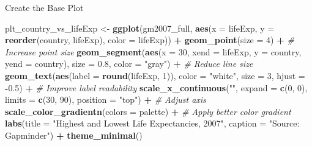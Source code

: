 \documentclass[
  ignorenonframetext,
]{beamer}
\newenvironment{Shaded}{\begin{snugshade}}{\end{snugshade}}
\newcommand{\AttributeTok}[1]{\textcolor[rgb]{0.13,0.29,0.53}{#1}}
\newcommand{\CommentTok}[1]{\textcolor[rgb]{0.56,0.35,0.01}{\textit{#1}}}
\newcommand{\DecValTok}[1]{\textcolor[rgb]{0.00,0.00,0.81}{#1}}
\newcommand{\FloatTok}[1]{\textcolor[rgb]{0.00,0.00,0.81}{#1}}
\newcommand{\FunctionTok}[1]{\textcolor[rgb]{0.13,0.29,0.53}{\textbf{#1}}}
\newcommand{\NormalTok}[1]{#1}
\newcommand{\OtherTok}[1]{\textcolor[rgb]{0.56,0.35,0.01}{#1}}
\newcommand{\SpecialCharTok}[1]{\textcolor[rgb]{0.81,0.36,0.00}{\textbf{#1}}}
\newcommand{\StringTok}[1]{\textcolor[rgb]{0.31,0.60,0.02}{#1}}
\begin{document}
\begin{frame}[fragile]{Create the Base Plot}
\label{create-the-base-plot}

\begin{Shaded}
\begin{Highlighting}[]
\NormalTok{plt\_country\_vs\_lifeExp }\OtherTok{\textless{}{-}} \FunctionTok{ggplot}\NormalTok{(gm2007\_full, }\FunctionTok{aes}\NormalTok{(}\AttributeTok{x =}\NormalTok{ lifeExp, }\AttributeTok{y =} \FunctionTok{reorder}\NormalTok{(country, lifeExp), }\AttributeTok{color =}\NormalTok{ lifeExp)) }\SpecialCharTok{+}
  \FunctionTok{geom\_point}\NormalTok{(}\AttributeTok{size =} \DecValTok{4}\NormalTok{) }\SpecialCharTok{+}  \CommentTok{\# Increase point size}
  \FunctionTok{geom\_segment}\NormalTok{(}\FunctionTok{aes}\NormalTok{(}\AttributeTok{x =} \DecValTok{30}\NormalTok{, }\AttributeTok{xend =}\NormalTok{ lifeExp, }\AttributeTok{y =}\NormalTok{ country, }\AttributeTok{yend =}\NormalTok{ country), }\AttributeTok{size =} \FloatTok{0.8}\NormalTok{, }\AttributeTok{color =} \StringTok{"gray"}\NormalTok{) }\SpecialCharTok{+}  \CommentTok{\# Reduce line size}
  \FunctionTok{geom\_text}\NormalTok{(}\FunctionTok{aes}\NormalTok{(}\AttributeTok{label =} \FunctionTok{round}\NormalTok{(lifeExp, }\DecValTok{1}\NormalTok{)), }\AttributeTok{color =} \StringTok{"white"}\NormalTok{, }\AttributeTok{size =} \DecValTok{3}\NormalTok{, }\AttributeTok{hjust =} \SpecialCharTok{{-}}\FloatTok{0.5}\NormalTok{) }\SpecialCharTok{+}  \CommentTok{\# Improve label readability}
  \FunctionTok{scale\_x\_continuous}\NormalTok{(}\StringTok{""}\NormalTok{, }\AttributeTok{expand =} \FunctionTok{c}\NormalTok{(}\DecValTok{0}\NormalTok{, }\DecValTok{0}\NormalTok{), }\AttributeTok{limits =} \FunctionTok{c}\NormalTok{(}\DecValTok{30}\NormalTok{, }\DecValTok{90}\NormalTok{), }\AttributeTok{position =} \StringTok{"top"}\NormalTok{) }\SpecialCharTok{+}  \CommentTok{\# Adjust axis}
  \FunctionTok{scale\_color\_gradientn}\NormalTok{(}\AttributeTok{colors =}\NormalTok{ palette) }\SpecialCharTok{+}  \CommentTok{\# Apply better color gradient}
  \FunctionTok{labs}\NormalTok{(}\AttributeTok{title =} \StringTok{"Highest and Lowest Life Expectancies, 2007"}\NormalTok{, }
       \AttributeTok{caption =} \StringTok{"Source: Gapminder"}\NormalTok{) }\SpecialCharTok{+}
  \FunctionTok{theme\_minimal}\NormalTok{()}
\end{Highlighting}
\end{Shaded}
\end{frame}
\end{document}
